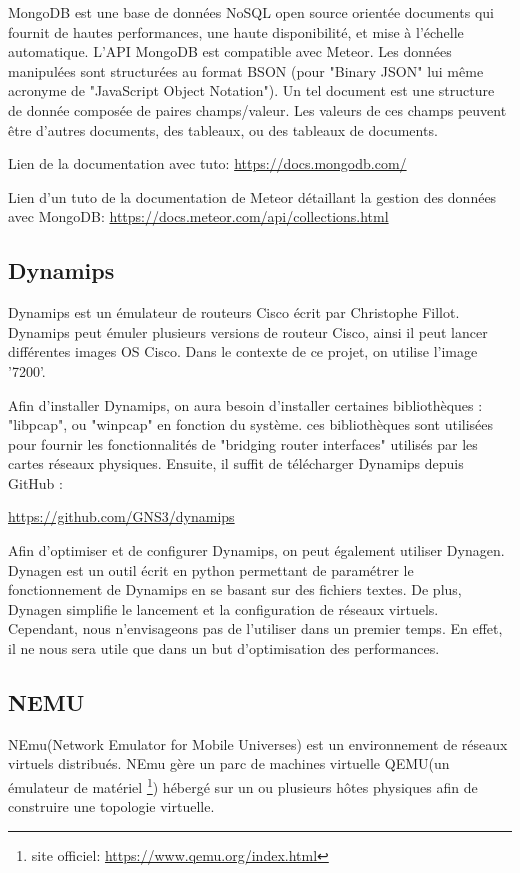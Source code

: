 MongoDB est une base de données NoSQL open source orientée documents qui fournit de hautes performances, une haute disponibilité, et mise à l'échelle automatique. L'API MongoDB est compatible avec Meteor.
Les données manipulées sont structurées au format BSON (pour "Binary JSON" lui même acronyme de "JavaScript Object Notation"). Un tel document est une structure de donnée composée de paires champs/valeur. Les valeurs de ces champs peuvent être d'autres documents, des tableaux, ou des tableaux de documents.


Lien de la documentation avec tuto: \url{https://docs.mongodb.com/}

Lien d'un tuto de la documentation de Meteor détaillant la gestion des données avec MongoDB: \url{https://docs.meteor.com/api/collections.html}

\subsection{Dynamips}
Dynamips est un émulateur de routeurs Cisco écrit par Christophe Fillot. Dynamips peut émuler plusieurs versions de routeur Cisco, ainsi il peut lancer différentes images OS Cisco. Dans le contexte de ce projet, on utilise l'image '7200'.

Afin d'installer Dynamips, on aura besoin d'installer certaines bibliothèques :  "libpcap", ou "winpcap" en fonction du système. ces bibliothèques sont utilisées pour fournir les fonctionnalités de "bridging router interfaces" utilisés par les cartes réseaux physiques.
\newline
Ensuite, il suffit de télécharger Dynamips depuis GitHub : 
\begin{center}
\url{https://github.com/GNS3/dynamips}
\end{center}

Afin d'optimiser et de configurer Dynamips, on peut également utiliser  Dynagen.
\newline
Dynagen est un outil écrit en python permettant de paramétrer le fonctionnement de Dynamips en se basant sur des fichiers textes. De plus,  Dynagen simplifie le lancement et la configuration de réseaux virtuels. Cependant, nous n'envisageons pas de l'utiliser dans un premier temps.
En effet, il ne nous sera utile que dans un but d'optimisation des performances. 

\pagebreak

\subsection{NEMU}
NEmu(Network Emulator for Mobile Universes) est un environnement de réseaux virtuels distribués. NEmu gère un parc de machines virtuelle QEMU(un émulateur de matériel \footnote{site officiel: \url{https://www.qemu.org/index.html}}) hébergé sur un ou plusieurs hôtes physiques afin de construire une topologie virtuelle. 

